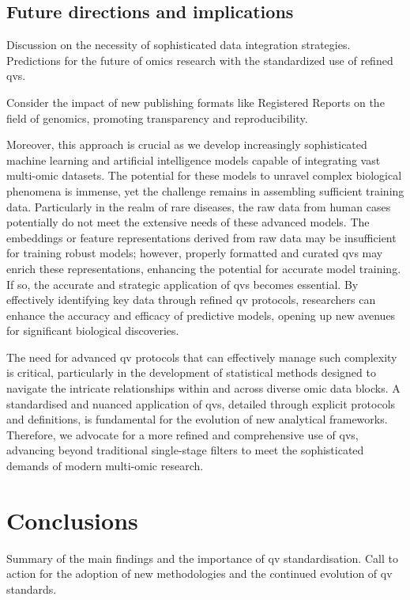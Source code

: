 \subsection{Future directions and implications} 

Discussion on the necessity of sophisticated data integration strategies. Predictions for the future of omics research with the standardized use of refined \ac{qv}s.

Consider the impact of new publishing formats like Registered Reports on the field of genomics, promoting transparency and reproducibility.
\cite{chambers2014instead}

Moreover, this approach is crucial as we develop increasingly sophisticated machine learning and artificial intelligence models capable of integrating vast multi-omic datasets. The potential for these models to unravel complex biological phenomena is immense, yet the challenge remains in assembling sufficient training data. Particularly in the realm of rare diseases, the raw data from human cases potentially do not meet the extensive needs of these advanced models. The embeddings or feature representations derived from raw data may be insufficient for training robust models; however, properly formatted and curated \ac{qv}s may enrich these representations, enhancing the potential for accurate model training. If so, the accurate and strategic application of \ac{qv}s becomes essential. By effectively identifying key data through refined \ac{qv} protocols, researchers can enhance the accuracy and efficacy of predictive models, opening up new avenues for significant biological discoveries.

The need for advanced \ac{qv} protocols that can effectively manage such complexity is critical, particularly in the development of statistical methods designed to navigate the intricate relationships within and across diverse omic data blocks. A standardised and nuanced application of \ac{qv}s, detailed through explicit protocols and definitions, is fundamental for the evolution of new analytical frameworks. Therefore, we advocate for a more refined and comprehensive use of \ac{qv}s, advancing beyond traditional single-stage filters to meet the sophisticated demands of modern multi-omic research. 

\section{Conclusions}
Summary of the main findings and the importance of \ac{qv} standardisation. Call to action for the adoption of new methodologies and the continued evolution of \ac{qv} standards.




